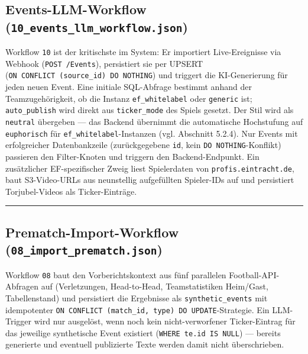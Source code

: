 \subsection{\texorpdfstring{Events-LLM-Workflow
(\texttt{10\_events\_llm\_workflow.json})}{Events-LLM-Workflow (10\_events\_llm\_workflow.json)}}\label{events-llm-workflow-10_events_llm_workflow.json}

Workflow \texttt{10} ist der kritischste im System: Er importiert
Live-Ereignisse via Webhook (\texttt{POST\ /Events}), persistiert sie
per UPSERT (\texttt{ON\ CONFLICT\ (source\_id)\ DO\ NOTHING}) und
triggert die KI-Generierung für jeden neuen Event. Eine initiale
SQL-Abfrage bestimmt anhand der Teamzugehörigkeit, ob die Instanz
\texttt{ef\_whitelabel} oder \texttt{generic} ist;
\texttt{auto\_publish} wird direkt aus \texttt{ticker\_mode} des Spiels
gesetzt. Der Stil wird als \texttt{neutral} übergeben --- das Backend
übernimmt die automatische Hochstufung auf \texttt{euphorisch} für
\texttt{ef\_whitelabel}-Instanzen (vgl. Abschnitt 5.2.4). Nur Events mit
erfolgreicher Datenbankzeile (zurückgegebene \texttt{id}, kein
\texttt{DO\ NOTHING}-Konflikt) passieren den Filter-Knoten und triggern
den Backend-Endpunkt. Ein zusätzlicher EF-spezifischer Zweig liest
Spielerdaten von \texttt{profis.eintracht.de}, baut S3-Video-URLs aus
neunstellig aufgefüllten Spieler-IDs auf und persistiert Torjubel-Videos
als Ticker-Einträge.

\begin{center}\rule{0.5\linewidth}{0.5pt}\end{center}

\subsection{\texorpdfstring{Prematch-Import-Workflow
(\texttt{08\_import\_prematch.json})}{Prematch-Import-Workflow (08\_import\_prematch.json)}}\label{prematch-import-workflow-08_import_prematch.json}

Workflow \texttt{08} baut den Vorberichtskontext aus fünf parallelen
Football-API-Abfragen auf (Verletzungen, Head-to-Head, Teamstatistiken
Heim/Gast, Tabellenstand) und persistiert die Ergebnisse als
\texttt{synthetic\_events} mit idempotenter
\texttt{ON\ CONFLICT\ (match\_id,\ type)\ DO\ UPDATE}-Strategie. Ein
LLM-Trigger wird nur ausgelöst, wenn noch kein nicht-verworfener
Ticker-Eintrag für das jeweilige synthetische Event existiert
(\texttt{WHERE\ te.id\ IS\ NULL}) --- bereits generierte und eventuell
publizierte Texte werden damit nicht überschrieben.

